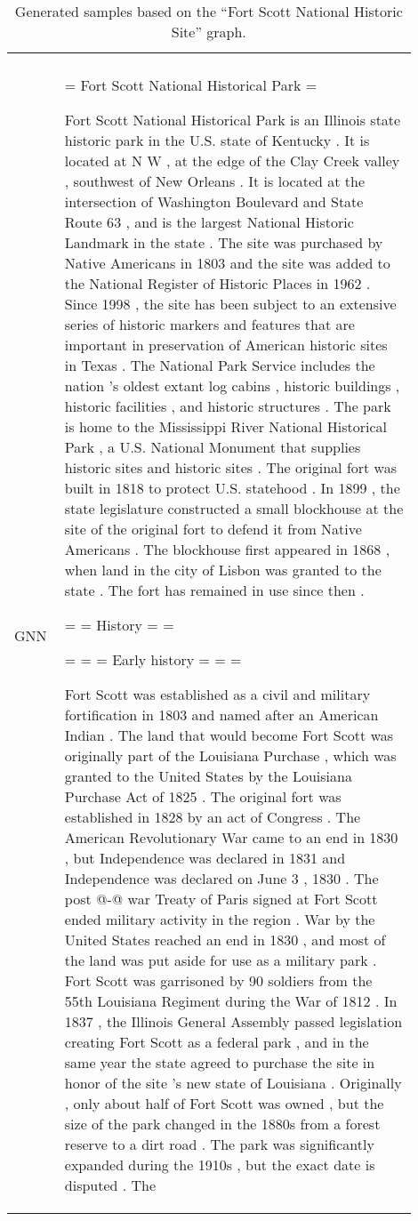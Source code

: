 \documentclass[11pt]{article}
\begin{document}
\begin{table*}[h]
\begin{tabular}{p{0.1\linewidth} | p{0.8\linewidth}}
{} \\
        \cline{1-2}
        GNN & {\tiny = Fort Scott National Historical Park =
        
 Fort Scott National Historical Park is an Illinois state historic park in the U.S. state of Kentucky . It is located at  N  W , at the edge of the Clay Creek valley , southwest of New Orleans . It is located at the intersection of Washington Boulevard and State Route 63 , and is the largest National Historic Landmark in the state . The site was purchased by Native Americans in 1803 and the site was added to the National Register of Historic Places in 1962 . Since 1998 , the site has been subject to an extensive series of historic markers and features that are important in preservation of American historic sites in Texas . 
 The National Park Service includes the nation 's oldest extant log cabins , historic buildings , historic facilities , and historic structures . The park is home to the Mississippi River National Historical Park , a U.S. National Monument that supplies historic sites and historic sites . The original fort was built in 1818 to protect U.S. statehood . In 1899 , the state legislature constructed a small blockhouse at the site of the original fort to defend it from Native Americans . The blockhouse first appeared in 1868 , when land in the city of Lisbon was granted to the state . The fort has remained in use since then .
 
 = = History = = 
 
 = = = Early history = = = 
 
 Fort Scott was established as a civil and military fortification in 1803 and named after an American Indian . The land that would become Fort Scott was originally part of the Louisiana Purchase , which was granted to the United States by the Louisiana Purchase Act of 1825 . The original fort was established in 1828 by an act of Congress . The American Revolutionary War came to an end in 1830 , but Independence was declared in 1831 and Independence was declared on June 3 , 1830 . The post @-@ war Treaty of Paris signed at Fort Scott ended military activity in the region . War by the United States reached an end in 1830 , and most of the land was put aside for use as a military park . 
 Fort Scott was garrisoned by 90 soldiers from the 55th Louisiana Regiment during the War of 1812 . In 1837 , the Illinois General Assembly passed legislation creating Fort Scott as a federal park , and in the same year the state agreed to purchase the site in honor of the site 's new state of Louisiana . Originally , only about half of Fort Scott was owned , but the size of the park changed in the 1880s from a forest reserve to a dirt road . The park was significantly expanded during the 1910s , but the exact date is disputed . The
 
} \\
        \hline
    \end{tabular}
    \caption{Generated samples based on the ``Fort Scott National Historic Site'' graph.}
    \label{tab:samples_vis2}
\end{table*}
\end{document}
